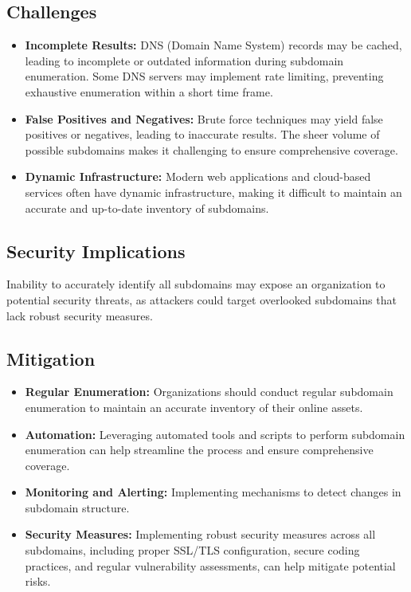 \documentclass[12pt]{article}
\begin{document}
\subsection{Challenges}\label{subsec:challenges}
\begin{itemize}
    \item \textbf{Incomplete Results:} DNS (Domain Name System) records may be cached, leading to incomplete or outdated information during subdomain enumeration. Some DNS servers may implement rate limiting, preventing exhaustive enumeration within a short time frame.
    \item \textbf{False Positives and Negatives:} Brute force techniques may yield false positives or negatives, leading to inaccurate results. The sheer volume of possible subdomains makes it challenging to ensure comprehensive coverage.
    \item \textbf{Dynamic Infrastructure:} Modern web applications and cloud-based services often have dynamic infrastructure, making it difficult to maintain an accurate and up-to-date inventory of subdomains.
\end{itemize}

\subsection{Security Implications}\label{subsec:security-implications}
Inability to accurately identify all subdomains may expose an organization to potential security threats, as attackers could target overlooked subdomains that lack robust security measures.

\subsection{Mitigation}\label{subsec:mitigation}
\begin{itemize}
    \item \textbf{Regular Enumeration:} Organizations should conduct regular subdomain enumeration to maintain an accurate inventory of their online assets.
    \item \textbf{Automation:} Leveraging automated tools and scripts to perform subdomain enumeration can help streamline the process and ensure comprehensive coverage.
    \item \textbf{Monitoring and Alerting:} Implementing mechanisms to detect changes in subdomain structure.
    \item \textbf{Security Measures:} Implementing robust security measures across all subdomains, including proper SSL/TLS configuration, secure coding practices, and regular vulnerability assessments, can help mitigate potential risks.
\end{itemize}
\end{document}

